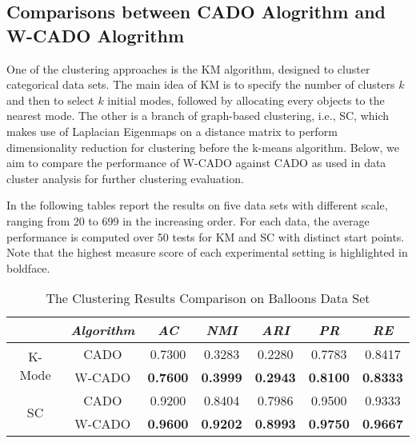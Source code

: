 \documentclass[review]{elsarticle}
\begin{document}
\subsection{Comparisons between CADO Alogrithm and W-CADO Alogrithm}
One of the clustering approaches is the KM algorithm, designed to cluster categorical data sets. The main idea of KM is to specify the number of clusters $k$ and then to select $k$ initial modes, followed by allocating every objects to the nearest mode. The other is a branch of graph-based clustering, i.e., SC, which makes use of Laplacian Eigenmaps on a distance matrix to perform dimensionality reduction for clustering before the k-means algorithm. Below, we aim to compare the performance of W-CADO against CADO as used in data cluster analysis for further clustering evaluation.

In the following tables report the results on five data sets with different scale, ranging from 20 to 699 in the increasing order. For each data, the average performance is computed over 50 tests for KM and SC with distinct start points. Note that the highest measure score of each experimental setting is highlighted in boldface.

\begin{table}[!h]\tabcolsep=0.065in
\centering
\caption{The Clustering Results Comparison on Balloons Data Set}
\small
\label{tab:The Clustering Results Comparison on Balloons Data Set}
\begin{tabular}{c|c|c|c|c|c|c}
\hline
\emph{}&\emph{Algorithm}&\emph{AC}&\emph{NMI}&\emph{ARI}&\emph{PR}&\emph{RE} \\
\hline
\multirow{2}{*}{K-Mode} & CADO & 0.7300 & 0.3283 & 0.2280 & 0.7783 & 0.8417\\
    & W-CADO & \textbf{0.7600} & \textbf{0.3999} & \textbf{0.2943} & \textbf{0.8100} & \textbf{0.8333}\\
    \hline
\multirow{2}{*}{SC} & CADO & 0.9200 & 0.8404 & 0.7986 & 0.9500 & 0.9333\\
    & W-CADO & \textbf{0.9600} & \textbf{0.9202} & \textbf{0.8993} & \textbf{0.9750} & \textbf{0.9667}\\
\hline
\end{tabular}
\end{table}
\end{document}

